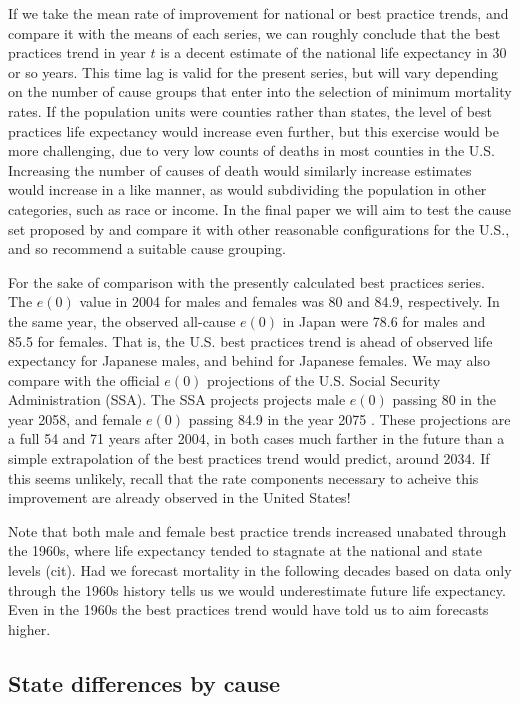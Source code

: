 \documentclass[11pt,oneside,a4paper]{article} %
\begin{document}
If we take the mean rate of improvement for national or best practice trends,
and compare it with the means of each series, we can roughly conclude that the
best practices trend in year $t$ is a decent estimate of the national life
expectancy in 30 or so years. This time lag is valid for the present series,
but will vary depending on the number of cause groups that enter into the
selection of minimum mortality rates. If the population units were
counties rather than states, the level of best practices life expectancy would
increase even further, but this exercise would be more challenging, due to very
low counts of deaths in most counties in the U.S. Increasing the number of
causes of death would similarly increase estimates would increase in a like
manner, as would subdividing the population in other categories, such as race
or income. In the final paper we will aim to test the cause set proposed by
\citet{vallin2008minimum} and compare it with other reasonable configurations for the U.S., and so recommend a suitable cause grouping.

For the sake of comparison with the presently calculated best practices series.
The $e(0)$ value in 2004 for males and females was 80 and 84.9, respectively. In
the same year, the observed all-cause $e(0)$ in Japan were 78.6 for males and
85.5 for females. That is, the U.S. best practices trend is ahead of observed
life expectancy for Japanese males, and behind for Japanese females. We may also
compare with the official $e(0)$ projections of the U.S. Social Security
Administration (SSA). The SSA projects projects male $e(0)$ passing 80 in the
year 2058, and female $e(0)$
passing 84.9 in the year 2075 \citep{SSA2005}. These projections are a full 54
and 71 years after 2004, in both cases much farther in the future than a simple extrapolation
of the best practices trend would predict, around 2034. If this seems unlikely,
recall that the rate components necessary to acheive this improvement are
already observed in the United States!

Note that both male and female best practice trends increased unabated through
the 1960s, where life expectancy tended to stagnate at the national and state
levels (cit). Had we forecast mortality in the following decades based on data
only through the 1960s history tells us we would underestimate future life
expectancy. Even in the 1960s the best practices trend would have told
us to aim forecasts higher.

\FloatBarrier
\subsection*{State differences by cause}
\end{document}

